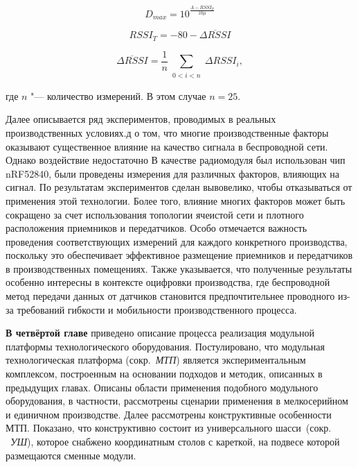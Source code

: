 \begin{equation}
D_{max} = 10^\frac{A-RSSI_T}{10 \mu}
\label{eq-5}
\end{equation}

\begin{equation}
RSSI_T = -80-\overline{{\mathit \Delta} RSSI}
\label{eq-6}
\end{equation}

\begin{equation}
\overline{{\mathit \Delta} RSSI} = \frac1n \sum_{\substack{0 < i < n}}{\mathit\Delta} RSSI_i,
\label{eq-7}
\end{equation}

\noindent где $n$ "--- количество измерений. В этом случае $n = 25$.  

Далее описывается ряд экспериментов, проводимых в реальных производственных условиях.д о том, что многие производственные факторы оказывают существенное влияние на качество сигнала в беспроводной сети. Однако воздействие недостаточно  В качестве радиомодуля был использован чип nRF52840, были проведены измерения для различных факторов, влияющих на сигнал. По результатам экспериментов сделан вывовелико, чтобы отказываться от применения этой технологии. Более того, влияние многих факторов может быть сокращено за счет использования топологии ячеистой сети и плотного расположения приемников и передатчиков. Особо отмечается важность проведения соответствующих измерений для каждого конкретного производства, поскольку это обеспечивает эффективное размещение приемников и передатчиков в производственных помещениях. Также указывается, что полученные результаты особенно интересны в контексте оцифровки производства, где беспроводной метод передачи данных от датчиков становится предпочтительнее проводного из-за требований гибкости и мобильности производственного процесса. 


\textbf{В четвёртой главе} приведено описание процесса реализация модульной платформы технологического оборудования. Постулировано, что модульная технологическая платформа (сокр.~\textit{МТП}) является экспериментальным комплексом, построенным на основании подходов и методик, описанных в предыдущих главах. Описаны области применения подобного модульного оборудования, в частности, рассмотрены сценарии применения в мелкосерийном и единичном производстве. Далее рассмотрены конструктивные особенности МТП. Показано, что конструктивно состоит из универсального шасси~(сокр. ~\textit{УШ}), которое снабжено координатным столов с кареткой, на подвесе которой размещаются сменные модули. 

